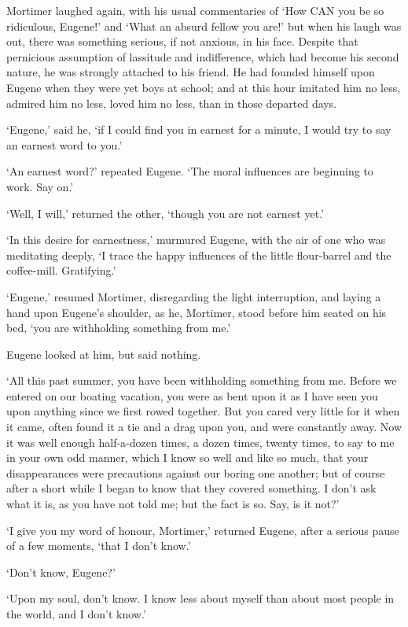 Mortimer laughed again, with his usual commentaries of ‘How CAN you be
so ridiculous, Eugene!’ and ‘What an absurd fellow you are!’ but when
his laugh was out, there was something serious, if not anxious, in his
face. Despite that pernicious assumption of lassitude and indifference,
which had become his second nature, he was strongly attached to his
friend. He had founded himself upon Eugene when they were yet boys at
school; and at this hour imitated him no less, admired him no less,
loved him no less, than in those departed days.

‘Eugene,’ said he, ‘if I could find you in earnest for a minute, I would
try to say an earnest word to you.’

‘An earnest word?’ repeated Eugene. ‘The moral influences are beginning
to work. Say on.’

‘Well, I will,’ returned the other, ‘though you are not earnest yet.’

‘In this desire for earnestness,’ murmured Eugene, with the air of one
who was meditating deeply, ‘I trace the happy influences of the little
flour-barrel and the coffee-mill. Gratifying.’

‘Eugene,’ resumed Mortimer, disregarding the light interruption, and
laying a hand upon Eugene’s shoulder, as he, Mortimer, stood before him
seated on his bed, ‘you are withholding something from me.’

Eugene looked at him, but said nothing.

‘All this past summer, you have been withholding something from me.
Before we entered on our boating vacation, you were as bent upon it as I
have seen you upon anything since we first rowed together. But you cared
very little for it when it came, often found it a tie and a drag upon
you, and were constantly away. Now it was well enough half-a-dozen
times, a dozen times, twenty times, to say to me in your own odd manner,
which I know so well and like so much, that your disappearances were
precautions against our boring one another; but of course after a short
while I began to know that they covered something. I don’t ask what it
is, as you have not told me; but the fact is so. Say, is it not?’

‘I give you my word of honour, Mortimer,’ returned Eugene, after a
serious pause of a few moments, ‘that I don’t know.’

‘Don’t know, Eugene?’

‘Upon my soul, don’t know. I know less about myself than about most
people in the world, and I don’t know.’

